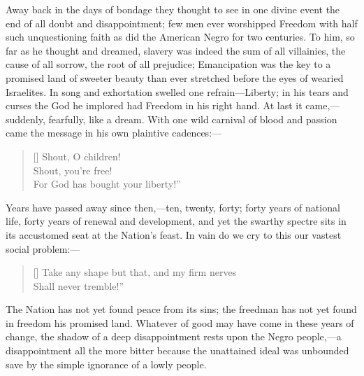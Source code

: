 Away back in the days of bondage they thought to see in one divine
event the end of all doubt and disappointment; few men ever worshipped
Freedom with half such unquestioning faith as did the American Negro
for two centuries. To him, so far as he thought and dreamed, slavery
was indeed the sum of all villainies, the cause of all sorrow, the
root of all  prejudice; Emancipation was the key to a promised
land of sweeter beauty than ever stretched before the eyes of wearied
Israelites. In song and exhortation swelled one refrain---Liberty; in
his tears and curses the God he implored had Freedom in his right
hand. At last it came,---suddenly, fearfully, like a dream. With one
wild carnival of blood and passion came the message in his own
plaintive cadences:---

\settowidth{}
\begin{verse}[\versewidth]
Shout, O children!\\
Shout, you're free!\\
For God has bought your liberty!''
\end{verse}

Years have passed away since then,---ten, twenty, forty; forty years
of national life, forty years of renewal and development, and yet the
swarthy spectre sits in its accustomed seat at the Nation's feast. In
vain do we cry to this our vastest social problem:---

\settowidth{}
\begin{verse}[\versewidth]
Take any shape but that, and my firm nerves\\
Shall never tremble!''
\end{verse}

The Nation has not yet found peace from its sins; the freedman has not
yet found in freedom his promised land. Whatever of good may have come
in these years of change, the shadow of a deep disappointment rests
upon the Negro people,---a disappointment all the more bitter because
the unattained ideal was unbounded save by the simple ignorance of a
lowly people.

